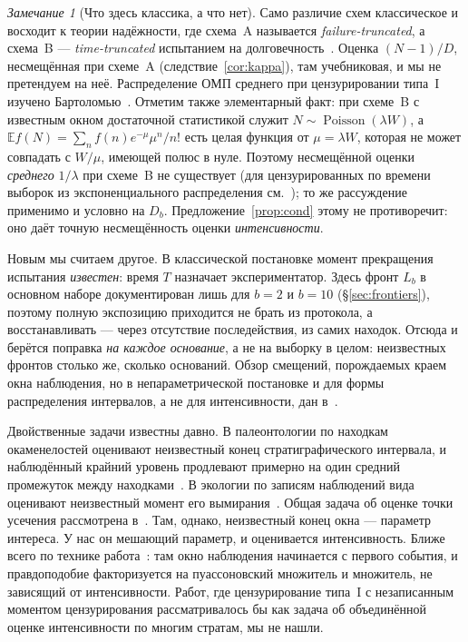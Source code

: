 \documentclass[11pt,a4paper]{article}
\theoremstyle{plain}
\theoremstyle{remark}
\newtheorem{remark}{Замечание}
\DeclareMathOperator{\Pois}{Poisson}
\begin{document}
\begin{remark}[Что здесь классика, а что нет]\label{rem:priority}
Само различие схем классическое и восходит к теории надёжности, где схема~A
называется \emph{failure-truncated}, а схема~B --- \emph{time-truncated}
испытанием на долговечность~\cite{epstein1954trunc,epsteinsobel1954}. Оценка
$(N-1)/D$, несмещённая при схеме~A (следствие~\ref{cor:kappa}), там
учебниковая, и мы не претендуем на неё. Распределение ОМП среднего при
цензурировании типа~I изучено Бартоломью~\cite{bartholomew1963}. Отметим также
элементарный факт: при схеме~B с известным окном достаточной статистикой служит
$N\sim\Pois(\lambda W)$, а $\mathbb E f(N)=\sum_nf(n)e^{-\mu}\mu^n/n!$ есть целая
функция от $\mu=\lambda W$, которая не может совпадать с $W/\mu$, имеющей полюс в
нуле. Поэтому несмещённой оценки \emph{среднего} $1/\lambda$ при схеме~B не
существует (для цензурированных по времени выборок из экспоненциального
распределения см.~\cite{sengupta2009}); то же рассуждение применимо и условно на
$D_b$. Предложение~\ref{prop:cond}
этому не противоречит: оно даёт точную несмещённость оценки \emph{интенсивности}.

Новым мы считаем другое. В классической постановке момент прекращения
испытания \emph{известен}: время $T$ назначает экспериментатор. Здесь фронт
$L_b$ в основном наборе документирован лишь для $b=2$ и $b=10$
(\S\ref{sec:frontiers}), поэтому полную
экспозицию приходится не брать из протокола, а восстанавливать --- через
отсутствие последействия, из самих находок. Отсюда и берётся поправка
\emph{на каждое основание}, а не на выборку в целом: неизвестных фронтов
столько же, сколько оснований. Обзор смещений, порождаемых краем окна
наблюдения, но в непараметрической постановке и для формы распределения
интервалов, а не для интенсивности, дан в~\cite{kivela2015}.

Двойственные задачи известны давно. В палеонтологии по находкам окаменелостей
оценивают неизвестный конец стратиграфического интервала, и наблюдённый крайний
уровень продлевают примерно на один средний промежуток между
находками~\cite{straussSadler1989,marshall1990}. В экологии по записям
наблюдений вида оценивают неизвестный момент его вымирания~\cite{solow1993}.
Общая задача об оценке точки усечения рассмотрена в~\cite{robsonwhitlock1964}.
Там, однако, неизвестный конец окна --- параметр интереса. У нас он мешающий
параметр, и оценивается интенсивность. Ближе всего по технике
работа~\cite{liu2023}: там окно наблюдения начинается с первого события, и
правдоподобие факторизуется на пуассоновский множитель и множитель, не зависящий
от интенсивности. Работ, где цензурирование типа~I с незаписанным моментом
цензурирования рассматривалось бы как задача об объединённой оценке
интенсивности по многим стратам, мы не нашли.
\end{remark}
\end{document}
